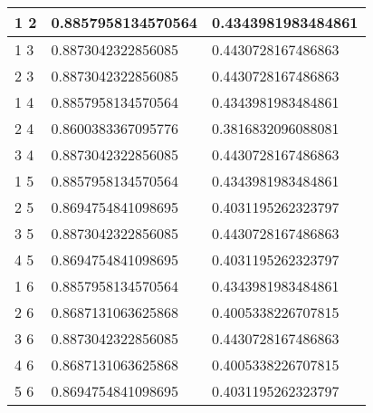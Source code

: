 \begin{table}[!htb] 
 \centering
 \begin{tabular}{|l|l|l|}
\hline 
1 2 &	0.8857958134570564 &	0.4343981983484861\\ 
\hline 
1 3 &	0.8873042322856085 &	0.4430728167486863\\ 
\hline 
2 3 &	0.8873042322856085 &	0.4430728167486863\\ 
\hline 
1 4 &	0.8857958134570564 &	0.4343981983484861\\ 
\hline 
2 4 &	0.8600383367095776 &	0.3816832096088081\\ 
\hline 
3 4 &	0.8873042322856085 &	0.4430728167486863\\ 
\hline 
1 5 &	0.8857958134570564 &	0.4343981983484861\\ 
\hline 
2 5 &	0.8694754841098695 &	0.4031195262323797\\ 
\hline 
3 5 &	0.8873042322856085 &	0.4430728167486863\\ 
\hline 
4 5 &	0.8694754841098695 &	0.4031195262323797\\ 
\hline 
1 6 &	0.8857958134570564 &	0.4343981983484861\\ 
\hline 
2 6 &	0.8687131063625868 &	0.4005338226707815\\ 
\hline 
3 6 &	0.8873042322856085 &	0.4430728167486863\\ 
\hline 
4 6 &	0.8687131063625868 &	0.4005338226707815\\ 
\hline 
5 6 &	0.8694754841098695 &	0.4031195262323797\\ 
\hline 
\end{tabular}
 \label{tab:1} 
\end{table} \\